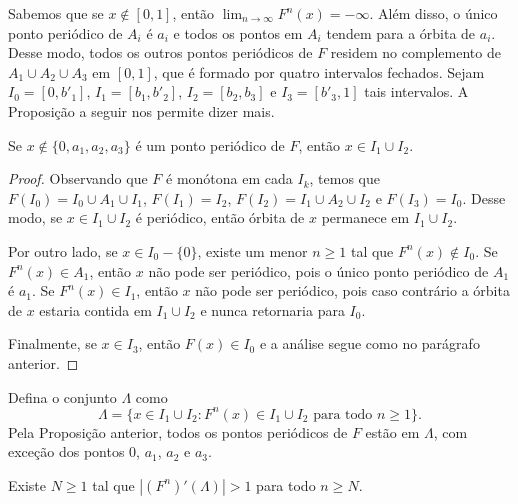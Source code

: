 Sabemos que se $x \notin [0, 1]$, então $\lim_{n \to \infty} F^n(x) = -\infty$. Além disso, o único ponto periódico de $A_i$ é $a_i$ e todos os pontos em $A_i$ tendem para a órbita de $a_i$. Desse modo, todos os outros pontos periódicos de $F$ residem no complemento de $A_1 \cup A_2 \cup A_3$ em $[0, 1]$, que é formado por quatro intervalos fechados. Sejam $I_0 = [0, b'_1]$, $I_1 = [b_1, b'_2]$, $I_2 = [b_2, b_3]$ e $I_3 = [b'_3, 1]$ tais intervalos. A Proposição a seguir nos permite dizer mais.

\begin{proposition}
Se $x \notin \{ 0, a_1, a_2, a_3 \}$ é um ponto periódico de $F$, então $x \in I_1 \cup I_2$.
\end{proposition}


\begin{proof}
Observando que $F$ é monótona em cada $I_k$, temos que $F(I_0) = I_0 \cup A_1 \cup I_1$, $F(I_1) = I_2$, $F(I_2) = I_1 \cup A_2 \cup I_2$ e $F(I_3) = I_0$. Desse modo, se $x \in I_1 \cup I_2$ é periódico, então órbita de $x$ permanece em $I_1 \cup I_2$.

Por outro lado, se $x \in I_0 - \{ 0 \}$, existe um menor $n \geq 1$ tal que $F^n(x) \notin I_0$. Se $F^n(x) \in A_1$, então $x$ não pode ser periódico, pois o único ponto periódico de $A_1$ é $a_1$. Se $F^n(x) \in I_1$, então $x$ não pode ser periódico, pois caso contrário a órbita de $x$ estaria contida em $I_1 \cup I_2$ e nunca retornaria para $I_0$.

Finalmente, se $x \in I_3$, então $F(x) \in I_0$ e a análise segue como no parágrafo anterior.
\end{proof}

Defina o conjunto $\Lambda$ como
$$\Lambda = \{ x \in I_1 \cup I_2 : F^n(x) \in I_1 \cup I_2 \textrm{ para todo } n \geq 1 \}.$$
Pela Proposição anterior, todos os pontos periódicos de $F$ estão em $\Lambda$, com exceção dos pontos $0$, $a_1$, $a_2$ e $a_3$.


\begin{lemma}
Existe $N \geq 1$ tal que $|(F^n)'(\Lambda)| > 1$ para todo $n \geq N$.
\end{lemma}



